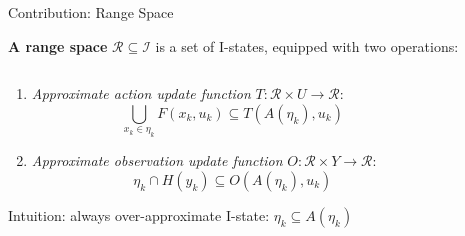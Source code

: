 \begin{frame}{Contribution: Range Space}
    \begin{definition}{\textbf{A range space}}
    $\mathcal{R} \subseteq \mathcal{I}$ is a set of I-states, equipped with two
    operations:
    \end{definition}
    \begin{columns}
        \begin{column}{.5\textwidth}
          \begin{enumerate}
          \item \emph{Approximate action update function} $T: \mathcal{R} \times U \to
            \mathcal{R}$:
            $$\bigcup_{x_k \in \eta_k} F(x_k, u_k) \subseteq T(A(\eta_k), u_k)$$
          \item \emph{Approximate observation update function} $O: \mathcal{R} \times
            Y \to \mathcal{R}$:
            $$\eta_k \cap H(y_k) \subseteq O(A(\eta_k), u_k)$$
          \end{enumerate}
          \textcolor{scred}{Intuition: always over-approximate I-state:
            $\eta_k \subseteq A(\eta_k)$}
        \end{column}
        \begin{column}{.4\textwidth}
            
        \end{column}
    \end{columns}
\end{frame}